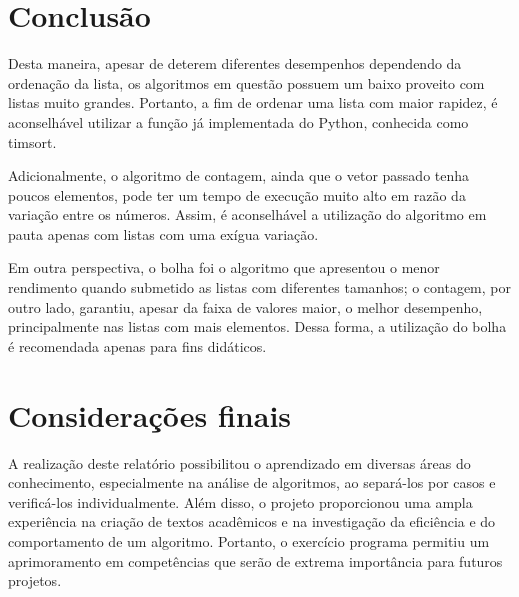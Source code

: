 \section{Conclusão}
Desta maneira, apesar de deterem diferentes desempenhos dependendo da ordenação da lista, os algoritmos em questão possuem um baixo proveito com listas muito grandes. Portanto, a fim de ordenar uma lista com maior rapidez, é aconselhável utilizar a função já implementada do Python, conhecida como timsort.

Adicionalmente, o algoritmo de contagem, ainda que o vetor passado tenha poucos elementos, pode ter um tempo de execução muito alto em razão da variação entre os números. Assim, é aconselhável a utilização do algoritmo em pauta apenas com listas com uma exígua variação.

Em outra perspectiva, o bolha foi o algoritmo que apresentou o menor rendimento quando submetido as listas com diferentes tamanhos; o contagem, por outro lado, garantiu, apesar da faixa de valores maior, o melhor desempenho, principalmente nas listas com mais elementos. Dessa forma, a utilização do bolha é recomendada apenas para fins didáticos.

\section{Considerações finais}
A realização deste relatório possibilitou o aprendizado em diversas áreas do conhecimento, especialmente na análise de algoritmos, ao separá-los por casos e verificá-los individualmente.
Além disso, o projeto proporcionou uma ampla experiência na criação de textos acadêmicos e na investigação da eficiência e do comportamento de um algoritmo.
Portanto, o exercício programa permitiu um aprimoramento em competências que serão de extrema importância para futuros projetos.